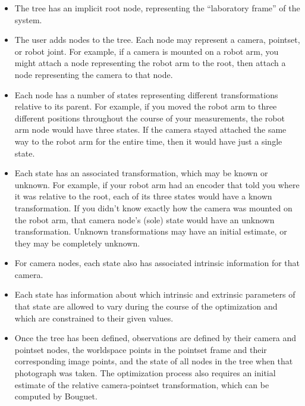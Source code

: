 \begin{itemize}
	\item The tree has an implicit root node, representing the ``laboratory frame'' of the system.
	\item The user adds nodes to the tree. Each node may represent a camera, pointset, or robot joint.
		For example, if a camera is mounted on a robot arm, you might attach a node representing
		the robot arm to the root, then attach a node representing the camera to that node.
	\item Each node has a number of states representing different transformations relative to its parent. 
		For example, if you moved the robot arm to three 
		different positions throughout the course of your measurements, the robot arm node would
		have three states. If the camera stayed attached the same way to the robot arm for the entire
		time, then it would have just a single state.
	\item Each state has an associated transformation, which may be known or unknown. For example,
		if your robot arm had an encoder that told you where it was relative to the root,
		each of its three states would have a known transformation. If you didn't know exactly how the
		camera was mounted on the robot arm, that camera node's (sole) 
		state would have an unknown transformation. Unknown transformations may have an initial estimate,
		or they may be completely unknown.
	\item For camera nodes, each state also has associated intrinsic information for that camera.
	\item Each state has information about which intrinsic and extrinsic parameters of that
		state are allowed to vary during the course of the optimization and which are constrained 
		to their given values.
	\item Once the tree has been defined, observations are defined by their camera and pointset nodes,
		the worldspace points in the pointset frame and their corresponding image points,
		and the state of all nodes in the tree when that photograph was taken. The optimization
		process also requires an initial estimate of the relative camera-pointset transformation,
		which can be computed by Bouguet.
\end{itemize}